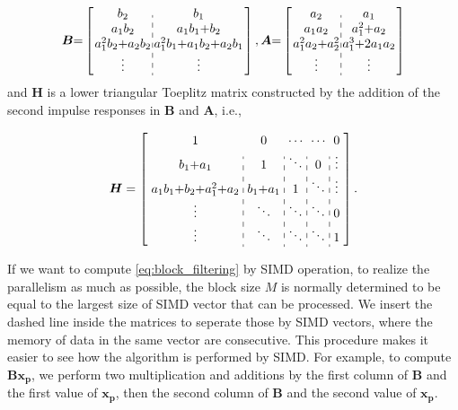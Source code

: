\begin{equation*}
    \begin{aligned}
          \bm{B} {=} \left[\arraycolsep=1.0pt\def\arraystretch{1.0}
            \begin{array}{c:c}
        b_2 & b_1 \\ 
        a_1b_2 & a_1b_1{+}b_2 \\
        a_1^2b_2{+}a_2b_2 & a_1^2b_1{+}a_1b_2{+}a_2b_1 \\
        \vdots & \vdots \\
        \end{array}\right], 
        \bm{A} {=} \left[\arraycolsep=1.0pt\def\arraystretch{1.0}
            \begin{array}{c:c} 
            a_2 & a_1 \\ 
            a_1a_2 & a_1^2{+}a_2 \\
            a_1^2a_2{+}a_2^2 & a_1^3{+}2a_1a_2 \\
            \vdots & \vdots \\
            \end{array}\right]
        \end{aligned}
\end{equation*}
and $\bm{H}$ is a lower triangular Toeplitz matrix constructed by the addition of the second impulse responses in $\bm{B}$ and $\bm{A}$, 
i.e.,

\begin{equation*}
        \bm{H} = \left[\arraycolsep=3.0pt\def\arraystretch{1.2}
            \begin{array}{c:c:c:c:c}
            1 & 0 & \cdots & \cdots & 0 \\ 
            b_1{+}a_1 & 1 & \ddots & 0  & \vdots \\
            a_1b_1{+}b_2{+}a_1^2{+}a_2 & b_1{+}a_1 & 1 & \ddots & \vdots \\
            \vdots & \ddots & \ddots & \ddots & 0 \\
            \vdots & \ddots & \ddots & \ddots & 1 \\
            \end{array}\right].  \\
\end{equation*}

If we want to compute \eqref{eq:block_filtering} by SIMD operation, to realize the parallelism as much as possible, 
the block size $M$ is normally determined to be equal to the largest size of SIMD vector that can be processed.
We insert the dashed line inside the matrices to seperate those by SIMD vectors, where the memory of data in the same vector are consecutive.
This procedure makes it easier to see how the algorithm is performed by SIMD.
For example, to compute $\bm{B}\bm{x_p}$, we perform two multiplication and additions by the first column of $\bm{B}$ and the first value of $\bm{x_p}$,
then the second column of $\bm{B}$ and the second value of $\bm{x_p}$.

